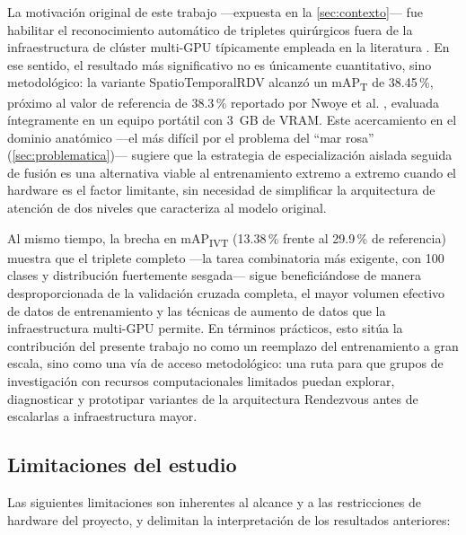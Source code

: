 \documentclass[11pt]{article}
\begin{document}
La motivación original de este trabajo —expuesta en la \cref{sec:contexto}— fue habilitar el reconocimiento automático de tripletes quirúrgicos fuera de la infraestructura de clúster multi-GPU típicamente empleada en la literatura \cite{nwoye2022rendezvous,twinanda2017}. En ese sentido, el resultado más significativo no es únicamente cuantitativo, sino metodológico: la variante SpatioTemporalRDV alcanzó un mAP\textsubscript{T} de 38.45\,\%, próximo al valor de referencia de 38.3\,\% reportado por Nwoye et al. \cite{nwoye2022rendezvous}, evaluada íntegramente en un equipo portátil con 3~GB de VRAM. Este acercamiento en el dominio anatómico —el más difícil por el problema del ``mar rosa'' (\cref{sec:problematica})— sugiere que la estrategia de especialización aislada seguida de fusión es una alternativa viable al entrenamiento extremo a extremo cuando el hardware es el factor limitante, sin necesidad de simplificar la arquitectura de atención de dos niveles que caracteriza al modelo original.

Al mismo tiempo, la brecha en mAP\textsubscript{IVT} (13.38\,\% frente al 29.9\,\% de referencia) muestra que el triplete completo —la tarea combinatoria más exigente, con 100 clases y distribución fuertemente sesgada— sigue beneficiándose de manera desproporcionada de la validación cruzada completa, el mayor volumen efectivo de datos de entrenamiento y las técnicas de aumento de datos que la infraestructura multi-GPU permite. En términos prácticos, esto sitúa la contribución del presente trabajo no como un reemplazo del entrenamiento a gran escala, sino como una vía de acceso metodológico: una ruta para que grupos de investigación con recursos computacionales limitados puedan explorar, diagnosticar y prototipar variantes de la arquitectura Rendezvous antes de escalarlas a infraestructura mayor.

\subsection{Limitaciones del estudio}
\label{sec:limitaciones}

Las siguientes limitaciones son inherentes al alcance y a las restricciones de hardware del proyecto, y delimitan la interpretación de los resultados anteriores:
\end{document}
